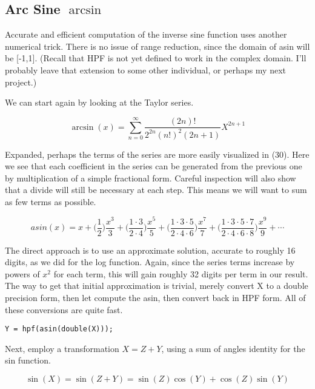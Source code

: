 \documentclass[a4paper,12pt]{article}
\begin{document}
\subsection{Arc Sine $\arcsin$}

Accurate and efficient computation of the inverse sine function uses another numerical trick. There is no issue of range reduction, since the domain of asin will be [-1,1]. (Recall that HPF is not yet defined to work in the complex domain. I'll probably leave that extension to some other individual, or perhaps my next project.)

We can start again by looking at the Taylor series.

\begin{equation}
   \arcsin(x) =  \sum_{n = 0}^{\infty} \frac{(2n)!}{2^{2n}(n!)^2(2n+1)} X^{2n+1}
\end{equation}

Expanded, perhaps the terms of the series are more easily visualized in (30). Here we see that each coefficient in the series can be generated from the previous one by multiplication of a simple fractional form. Careful inspection will also show that a divide will still be necessary at each step. This means we will want to sum as few terms as possible.

\begin{equation}
   asin(x) = x +  \biggl( \frac{1}{2}  \biggr) \frac{x^3}{3} + \biggl( \frac{1\cdot 3}{2 \cdot  4} \biggr) \frac{x^5}{5} +  \biggl( \frac{1 \cdot 3 \cdot 5}{2 \cdot 4 \cdot 6} \biggr) \frac{x^7}{7} +  \biggl( \frac{1 \cdot 3 \cdot 5 \cdot 7}{2 \cdot 4 \cdot 6 \cdot 8} \biggr) \frac{x^9}{9} +  \cdots
\end{equation}

The direct approach is to use an approximate solution, accurate to roughly 16 digits, as we did for the log function. Again, since the series terms increase by powers of $x^2$ for each term, this will gain roughly 32 digits per term in our result. The way to get that initial approximation is trivial, merely convert X to a double precision form, then let \Ml compute the asin, then convert back in HPF form. All of these conversions are quite fast.

\begin{lstlisting}
Y = hpf(asin(double(X)));
\end{lstlisting}

Next, employ a transformation $X = Z + Y$, using a sum of angles identity for the sin function.

\begin{equation}
   \sin(X) = \sin(Z + Y) = \sin(Z)\cos(Y) + \cos(Z)\sin(Y)
\end{equation}
\end{document}
